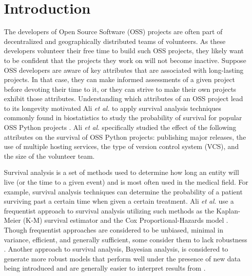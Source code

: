 \documentclass[acmconf]{acmart}
\begin{document}


\maketitle

\section{Introduction} \label{intro}
The developers of Open Source Software (OSS) projects are often part of decentralized and geographically distributed teams of volunteers.
As these developers volunteer their free time to build such OSS projects, they likely want to be confident that the projects they work on will not become inactive.
Suppose OSS developers are aware of key attributes that are associated with long-lasting projects. In that case, they can make informed assessments of a given project before devoting their time to it, or they can strive to make their own projects exhibit those attributes.
Understanding which attributes of an OSS project lead to its longevity motivated Ali \emph{et al.} to apply survival analysis techniques commonly found in biostatistics to study the probability of survival for popular OSS Python projects \cite{ali2020cheating}.
Ali \emph{et al.} specifically studied the effect of the following attributes on the survival of OSS Python projects: publishing major releases, the use of multiple hosting services, the type of version control system (VCS), and the size of the volunteer team.

Survival analysis is a set of methods used to determine how long an entity will live (or the time to a given event) and is most often used in the medical field.
For example, survival analysis techniques can determine the probability of a patient surviving past a certain time when given a certain treatment. 
Ali \emph{et al.} use a frequentist approach to survival analysis utilizing such methods as the Kaplan-Meier (K-M) survival estimator and the Cox Proportional-Hazards model \cite{kaplan1958nonparametric, cox1972regression}.
Though frequentist approaches are considered to be unbiased, minimal in variance, efficient, and generally sufficient, some consider them to lack robustness \cite{renganathan2016overview}. Another approach to survival analysis, Bayesian analysis, is considered to generate more robust models that perform well under the presence of new data being introduced and are generally easier to interpret results from \cite{renganathan2016overview}.
\end{document}
